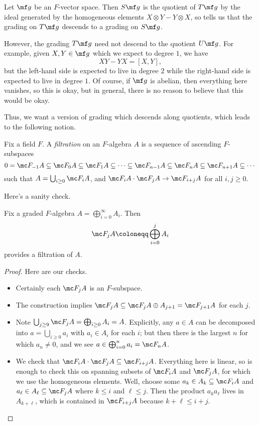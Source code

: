 \documentclass[../notes.tex]{subfiles}
\begin{document}
\begin{example}
	Let $\mf g$ be an $F$-vector space. Then $S\mf g$ is the quotient of $T\mf g$ by the ideal generated by the homogeneous elements $X\otimes Y-Y\otimes X$, so  tells us that the grading on $T\mf g$ descends to a grading on $S\mf g$.
\end{example}
However, the grading $T\mf g$ need not descend to the quotient $U\mf g$. For example, given $X,Y\in\mf g$ which we expect to degree $1$, we have
\[XY-YX=[X,Y],\]
but the left-hand side is expected to live in degree $2$ while the right-hand side is expected to live in degree $1$. Of course, if $\mf g$ is abelian, then everything here vanishes, so this is okay, but in general, there is no reason to believe that this would be okay.

Thus, we want a version of grading which descends along quotients, which leads to the following notion.
\begin{definition}
	Fix a field $F$. A \textit{filtration} on an $F$-algebra $A$ is a sequence of ascending $F$-subspaces
	\[0=\mc F_{-1}A\subseteq\mc F_0A\subseteq\mc F_1A\subseteq\cdots\subseteq\mc F_{n-1}A\subseteq\mc F_nA\subseteq\mc F_{n+1}A\subseteq\cdots\]
	such that $A=\bigcup_{i\ge0}\mc F_iA$, and $\mc F_iA\cdot\mc F_jA\to\mc F_{i+j}A$ for all $i,j\ge0$.
\end{definition}
Here's a sanity check.
\begin{lemma} \label{lem:grade-to-filtration}
	Fix a graded $F$-algebra $A=\bigoplus_{i=0}^\infty A_i$. Then
	\[\mc F_jA\coloneqq\bigoplus_{i=0}^jA_i\]
	provides a filtration of $A$.
\end{lemma}
\begin{proof}
	Here are our checks.
	\begin{itemize}
		\item Certainly each $\mc F_jA$ is an $F$-subspace.
		\item The construction implies $\mc F_jA\subseteq\mc F_jA\oplus A_{j+1}=\mc F_{j+1}A$ for each $j$.
		\item Note $\bigcup_{j\ge9}\mc F_jA=\bigoplus_{i\ge0}A_i=A$. Explicitly, any $a\in A$ can be decomposed into $a=\bigcup_{i\ge0}a_i$ with $a_i\in A_i$ for each $i$; but then there is the largest $n$ for which $a_n\ne0$, and we see $a\in\bigoplus_{i=0}^na_i=\mc F_nA$.
		\item We check that $\mc F_iA\cdot\mc F_jA\subseteq\mc F_{i+j}A$. Everything here is linear, so is enough to check this on spanning subsets of $\mc F_iA$ and $\mc F_jA$, for which we use the homogeneous elements. Well, choose some $a_k\in A_k\subseteq\mc F_iA$ and $a_\ell\in A_\ell\subseteq\mc F_jA$ where $k\le i$ and $\ell\le j$. Then the product $a_ka_\ell$ lives in $A_{k+\ell}$, which is contained in $\mc F_{i+j}A$ because $k+\ell\le i+j$.
		\qedhere
	\end{itemize}
\end{proof}
\end{document}
